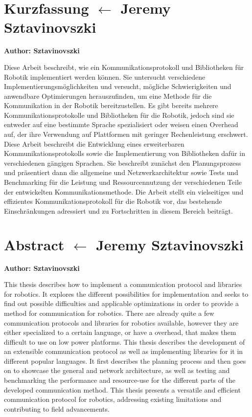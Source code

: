 \chapter{Kurzfassung $\leftarrow$ Jeremy Sztavinovszki}
\textbf{Author: Sztavinovszki}

\vspace{10mm}
Diese Arbeit beschreibt, wie ein Kommunikationsprotokoll und Bibliotheken für Robotik 
implementiert werden können. Sie untersucht verschiedene Implementierungsmöglichkeiten 
und versucht, mögliche Schwierigkeiten und anwendbare Optimierungen herauszufinden, um
eine Methode für die Kommunikation in der Robotik bereitzustellen. Es gibt bereits mehrere 
Kommunikationsprotokolle und Bibliotheken für die Robotik, jedoch sind sie entweder auf eine
bestimmte Sprache spezialisiert oder weisen einen Overhead auf, der ihre Verwendung 
auf Plattformen mit geringer Rechenleistung erschwert. Diese Arbeit beschreibt die Entwicklung
eines erweiterbaren Kommunikationsprotokolls sowie die Implementierung von Bibliotheken dafür
in verschiedenen gängigen Sprachen. Sie beschreibt zunächst den Planungsprozess und 
präsentiert dann die allgemeine und Netzwerkarchitektur sowie Tests und Benchmarking für
die Leistung und Ressourcennutzung der verschiedenen Teile der entwickelten Kommunikationsmethode.
Die Arbeit stellt ein vielseitiges und effizientes Kommunikationsprotokoll für die Robotik vor,
das bestehende Einschränkungen adressiert und zu Fortschritten in diesem Bereich beiträgt.


\chapter{Abstract $\leftarrow$ Jeremy Sztavinovszki}
\textbf{Author: Sztavinovszki}

\vspace{10mm}

This thesis describes how to implement a communication protocol and libraries for robotics. 
It explores the different possibilities for implementation and seeks to find out possible 
difficulties and applicable  optimizations in order to provide a method for communication 
for robotics. There are already  quite a few communication protocols and libraries for 
robotics available, however they are either specialized to a certain language, or have a 
overhead, that makes them difficult to use on low power platforms. This thesis describes
the development of an extensible communication protocol as well as implementing libraries 
for it in different popular languages. It first describes the planning process and then
goes on to showcase the general and network architecture, as well as testing and benchmarking 
the performance and resource-use for the different parts of the developed communication
method. This thesis presents a versatile and efficient communication protocol for robotics,
addressing existing limitations and contributing to field advancements.


